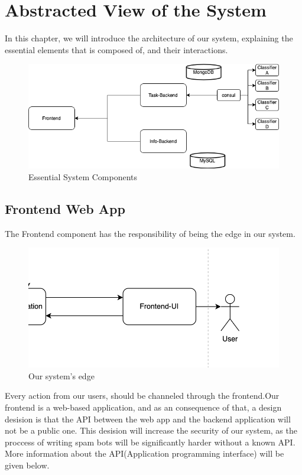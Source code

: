 \chapter{Abstracted View of the System}
	\label{4}
	In this chapter, we will introduce the architecture of our system, explaining the essential elements
	that is composed of, and their interactions.
	\begin{figure}[H]
		\iftrue
		\caption{Essential System Components}
		\centering
		\includegraphics[scale=0.3]{figures/system-overview}
		\fi
	\end{figure}
	\section{Frontend Web App}
		The Frontend component has the responsibility of being the edge in our system.
		\begin{figure}[H]
			\iftrue
			\caption{Our system's edge}
			\centering
			\includegraphics[scale=0.3]{figures/frontend-actor}
			\fi
		\end{figure}
		Every action from our users, should be channeled through the frontend.Our frontend is a web-based application, 
		and as an consequence of that, a design desision is that the API between the web app and the backend application
		will not be a public one. This desision will increase the security of our system, as the proccess of writing 
		spam bots will be significantly harder without a known API. More information about the API(Application 
		programming interface) will be given below.
